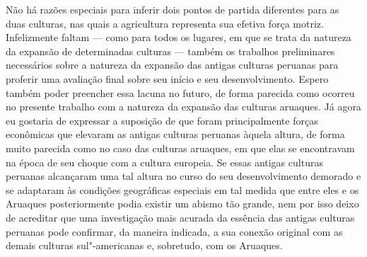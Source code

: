 Não há razões especiais para inferir dois pontos de partida diferentes
para as duas culturas, nas quais a agricultura representa sua efetiva
força motriz. Infelizmente faltam --- como para todos os lugares, em que
se trata da natureza da expansão de determinadas culturas --- também os
trabalhos preliminares necessários sobre a natureza da expansão das
antigas culturas peruanas para proferir uma avaliação final sobre seu
início e seu desenvolvimento. Espero também poder preencher essa lacuna
no futuro, de forma parecida como ocorreu no presente trabalho com a
natureza da expansão das culturas aruaques. Já agora eu gostaria de
expressar a suposição de que foram principalmente forças econômicas que
elevaram as antigas culturas peruanas àquela altura, de forma muito
parecida como no caso das culturas aruaques, em que elas se encontravam
na época de seu choque com a cultura europeia. Se essas antigas culturas
peruanas alcançaram uma tal altura no curso do seu desenvolvimento
demorado e se adaptaram às condições geográficas especiais em tal medida
que entre eles e os Aruaques posteriormente podia existir um abismo tão
grande, nem por isso deixo de acreditar que uma investigação mais
acurada da essência das antigas culturas peruanas pode confirmar, da
maneira indicada, a sua conexão original com as demais culturas
sul"-americanas e, sobretudo, com os Aruaques.

